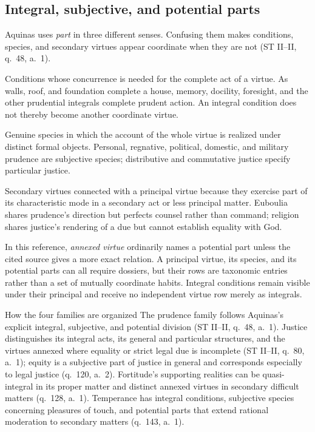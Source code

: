 \subsection{Integral, subjective, and potential parts}

Aquinas uses \emph{part} in three different senses. Confusing them makes conditions, species, and secondary virtues appear coordinate when they are not (ST II--II, q.~48, a.~1).

\begin{description}[leftmargin=2.25em,style=nextline,itemsep=0.35em]
  \item[\textbf{Integral parts}]
  Conditions whose concurrence is needed for the complete act of a virtue. As walls, roof, and foundation complete a house, memory, docility, foresight, and the other prudential integrals complete prudent action. An integral condition does not thereby become another coordinate virtue.

  \item[\textbf{Subjective parts}]
  Genuine species in which the account of the whole virtue is realized under distinct formal objects. Personal, regnative, political, domestic, and military prudence are subjective species; distributive and commutative justice specify particular justice.

  \item[\textbf{Potential parts}]
  Secondary virtues connected with a principal virtue because they exercise part of its characteristic mode in a secondary act or less principal matter. Euboulia shares prudence's direction but perfects counsel rather than command; religion shares justice's rendering of a due but cannot establish equality with God.
\end{description}

In this reference, \emph{annexed virtue} ordinarily names a potential part unless the cited source gives a more exact relation. A principal virtue, its species, and its potential parts can all require dossiers, but their rows are taxonomic entries rather than a set of mutually coordinate habits. Integral conditions remain visible under their principal and receive no independent virtue row merely as integrals.

\begin{studybox}{How the four families are organized}
The prudence family follows Aquinas's explicit integral, subjective, and potential division (ST II--II, q.~48, a.~1). Justice distinguishes its integral acts, its general and particular structures, and the virtues annexed where equality or strict legal due is incomplete (ST II--II, q.~80, a.~1); equity is a subjective part of justice in general and corresponds especially to legal justice (q.~120, a.~2). Fortitude's supporting realities can be quasi-integral in its proper matter and distinct annexed virtues in secondary difficult matters (q.~128, a.~1). Temperance has integral conditions, subjective species concerning pleasures of touch, and potential parts that extend rational moderation to secondary matters (q.~143, a.~1).
\end{studybox}

